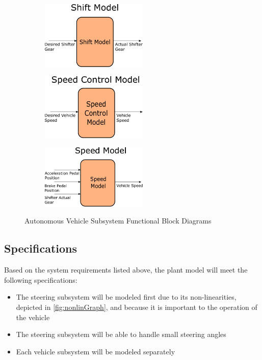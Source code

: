 \documentclass[letterpaper,12pt]{article}   %
\begin{document}
\begin{figure}[htb]
\vspace{36pt}
\begin{subfigure}{0.25\textwidth}
  \includegraphics[width=2in]{figs/inkscape/shiftModelArchitecture}
\end{subfigure}\hfill
\begin{subfigure}{0.25\textwidth}
  \includegraphics[width=2in]{figs/inkscape/speedControlModelArchitecture}
\end{subfigure}\hfill
\begin{subfigure}{0.25\textwidth}
  \includegraphics[width=2in]{figs/inkscape/speedModelArchitecture}
\end{subfigure}
\vspace{16pt}
\caption{Autonomous Vehicle Subsystem Functional Block Diagrams}
\label{fig:subFunctionalBlock}
\end{figure}


 \subsection{Specifications}
 Based on the system requirements listed above, the plant model will meet the following specifications:
 \begin{itemize}
    \item The steering subsystem will be modeled first due to its non-linearities, depicted in \autoref{fig:nonlinGraph}, and because it is important to the operation of the vehicle 
    \item The steering subsystem will be able to handle small steering angles
    \item Each vehicle subsystem will be modeled separately
 \end{itemize}
\end{document}

